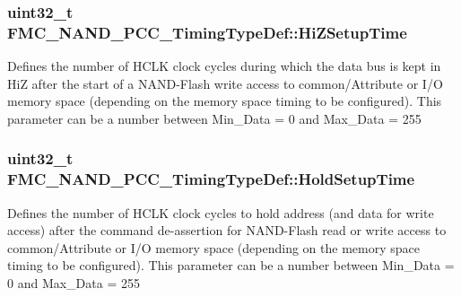 \subsubsection[{\texorpdfstring{Hi\+Z\+Setup\+Time}{HiZSetupTime}}]{\setlength{\rightskip}{0pt plus 5cm}uint32\+\_\+t F\+M\+C\+\_\+\+N\+A\+N\+D\+\_\+\+P\+C\+C\+\_\+\+Timing\+Type\+Def\+::\+Hi\+Z\+Setup\+Time}\hypertarget{struct_f_m_c___n_a_n_d___p_c_c___timing_type_def_a0dbc37d1de815af58ecfd6c4e06b176d}{}\label{struct_f_m_c___n_a_n_d___p_c_c___timing_type_def_a0dbc37d1de815af58ecfd6c4e06b176d}
Defines the number of H\+C\+LK clock cycles during which the data bus is kept in HiZ after the start of a N\+A\+N\+D-\/\+Flash write access to common/\+Attribute or I/O memory space (depending on the memory space timing to be configured). This parameter can be a number between Min\+\_\+\+Data = 0 and Max\+\_\+\+Data = 255 
\subsubsection[{\texorpdfstring{Hold\+Setup\+Time}{HoldSetupTime}}]{\setlength{\rightskip}{0pt plus 5cm}uint32\+\_\+t F\+M\+C\+\_\+\+N\+A\+N\+D\+\_\+\+P\+C\+C\+\_\+\+Timing\+Type\+Def\+::\+Hold\+Setup\+Time}\hypertarget{struct_f_m_c___n_a_n_d___p_c_c___timing_type_def_a57728d0f89fd95015265e4dd195226d3}{}\label{struct_f_m_c___n_a_n_d___p_c_c___timing_type_def_a57728d0f89fd95015265e4dd195226d3}
Defines the number of H\+C\+LK clock cycles to hold address (and data for write access) after the command de-\/assertion for N\+A\+N\+D-\/\+Flash read or write access to common/\+Attribute or I/O memory space (depending on the memory space timing to be configured). This parameter can be a number between Min\+\_\+\+Data = 0 and Max\+\_\+\+Data = 255 
